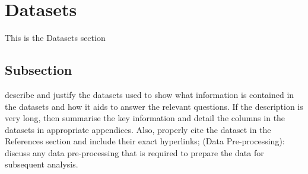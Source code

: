 \section{Datasets}\label{Section label}
This is the Datasets section
\subsection{Subsection}\label{subsection}
describe and justify the datasets used to show what information is contained in the datasets and how it aids to answer the relevant questions. If the description is very long, then summarise the key information and detail the columns in the datasets in appropriate appendices. Also, properly cite the dataset in the References section and include their exact hyperlinks; \newline
(Data Pre-processing): discuss any data pre-processing that is required to prepare the data for subsequent analysis. 

